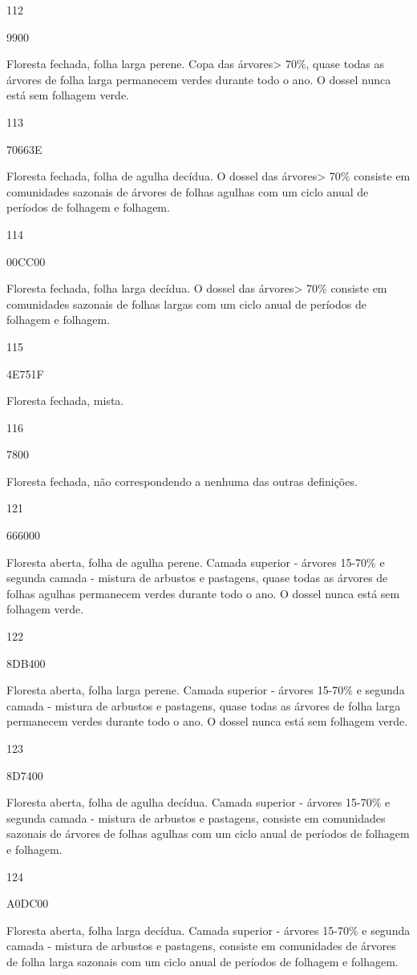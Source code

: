 \documentclass[
]{krantz}
\begin{document}
112

9900

Floresta fechada, folha larga perene. Copa das árvores\textgreater{} 70\%, quase todas as árvores de folha larga permanecem verdes durante todo o ano. O dossel nunca está sem folhagem verde.

113

70663E

Floresta fechada, folha de agulha decídua. O dossel das árvores\textgreater{} 70\% consiste em comunidades sazonais de árvores de folhas agulhas com um ciclo anual de períodos de folhagem e folhagem.

114

00CC00

Floresta fechada, folha larga decídua. O dossel das árvores\textgreater{} 70\% consiste em comunidades sazonais de folhas largas com um ciclo anual de períodos de folhagem e folhagem.

115

4E751F

Floresta fechada, mista.

116

7800

Floresta fechada, não correspondendo a nenhuma das outras definições.

121

666000

Floresta aberta, folha de agulha perene. Camada superior - árvores 15-70\% e segunda camada - mistura de arbustos e pastagens, quase todas as árvores de folhas agulhas permanecem verdes durante todo o ano. O dossel nunca está sem folhagem verde.

122

8DB400

Floresta aberta, folha larga perene. Camada superior - árvores 15-70\% e segunda camada - mistura de arbustos e pastagens, quase todas as árvores de folha larga permanecem verdes durante todo o ano. O dossel nunca está sem folhagem verde.

123

8D7400

Floresta aberta, folha de agulha decídua. Camada superior - árvores 15-70\% e segunda camada - mistura de arbustos e pastagens, consiste em comunidades sazonais de árvores de folhas agulhas com um ciclo anual de períodos de folhagem e folhagem.

124

A0DC00

Floresta aberta, folha larga decídua. Camada superior - árvores 15-70\% e segunda camada - mistura de arbustos e pastagens, consiste em comunidades de árvores de folha larga sazonais com um ciclo anual de períodos de folhagem e folhagem.
\end{document}
